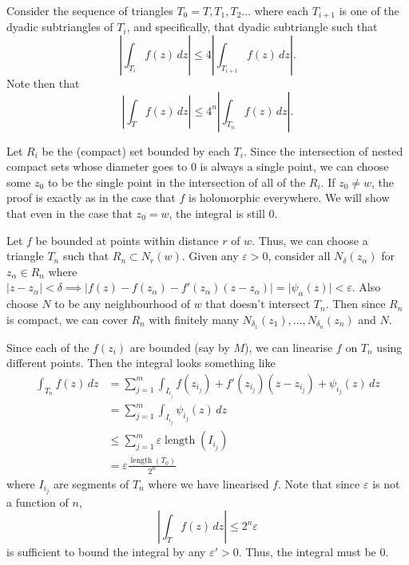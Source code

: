 \documentclass[12 pt, letterpaper]{hmcpset}
\begin{document}
\begin{solution}
	Consider the sequence of triangles $T_{0} = T, T_{1}, T_{2} \dots$ where each $T_{i + 1}$ is one of the dyadic subtriangles of $T_{i}$, and specifically, that dyadic subtriangle such that
	 \[
		\left \lvert \int_{T_{i}} f(z) \, dz \right \rvert \le 4 \left \lvert \int_{T_{i + 1}} f(z) \, dz  \right \rvert.
	\]
	Note then that
	\[
		\left \lvert \int_{T} f(z) \, dz \right \rvert \le 4^{n} \left \lvert \int_{T_{n}} f(z) \, dz  \right \rvert.
	\]

	Let $R_{i}$ be the (compact) set bounded by each $T_{i}$. Since the intersection of nested compact sets whose diameter goes to $0$ is always a single point, we can choose some $z_{0}$ to be the single point in the intersection of all of the $R_{i}$. If $z_{0} \neq w$, the proof is exactly as in the case that $f$ is holomorphic everywhere. We will show that even in the case that $z_{0} = w$, the integral is still $0$.

	Let $f$ be bounded at points within distance $r$ of $w$. Thus, we can choose a triangle $T_{n}$ such that $R_{n} \subset N_{r}(w)$. Given any $\varepsilon > 0$, consider all $N_{\delta}(z_{\alpha})$ for $z_{\alpha} \in R_{n}$ where $\lvert z - z_{\alpha} \rvert < \delta \implies  \lvert f(z) - f(z_{\alpha}) - f'(z_{\alpha}) (z - z_{\alpha}) \rvert = \lvert \psi_{\alpha}(z) \rvert < \varepsilon$. Also choose $N$ to be any neighbourhood of $w$ that doesn't intersect $T_{n}$. Then since $R_{n}$ is compact, we can cover $R_{n}$ with finitely many $N_{\delta_{1}}(z_{1}), \dots, N_{\delta_{n}}(z_{n})$ and $N$.

	Since each of the $f(z_{i})$ are bounded (say by $M$), we can linearise $f$ on $T_{n}$ using different points. Then the integral looks something like
	\[
		\begin{split}
			\int_{T_{n}} f(z) \, dz & = \sum_{j = 1}^{m} \int_{I_{i_j}} f(z_{i_{j}}) + f'(z_{i_{j}})(z - z_{i_{j}}) + \psi_{i_{j}}(z) \, dz \\
						& = \sum_{j = 1}^{m} \int_{I_{i_{j}}} \psi_{i_{j}}(z) \, dz \\
						& \le \sum_{j = 1}^{m} \varepsilon \operatorname{length}(I_{i_{j}}) \\
						& = \varepsilon \frac{\operatorname{length}(T_{0})}{2^{n}}
		\end{split} 
	\]
	where $I_{i_{j}}$ are segments of $T_{n}$ where we have linearised $f$. Note that since $\varepsilon$ is not a function of $n$,
	\[
		\left \lvert \int_{T} f(z) \, dz  \right \rvert \le 2^{n} \varepsilon
	\]
	is sufficient to bound the integral by any $\varepsilon' > 0$. Thus, the integral must be $0$.


\end{solution}
\end{document}
